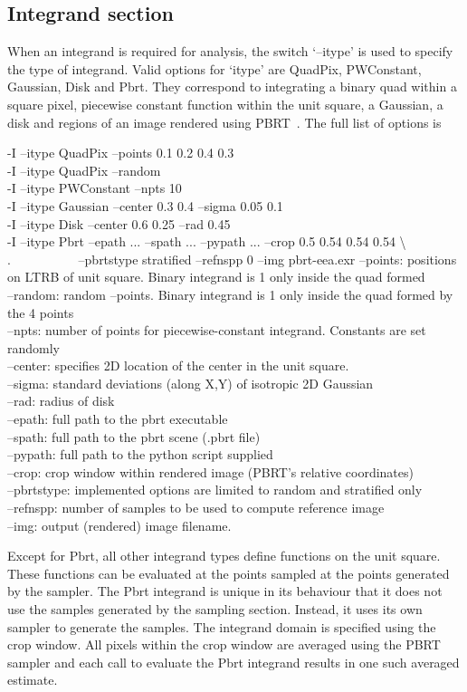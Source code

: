 \subsection{Integrand section}
When an integrand is required for analysis, the switch `--itype' is used to specify the type of integrand. Valid options for `itype' are QuadPix, PWConstant, Gaussian, Disk and Pbrt. They correspond to integrating a binary quad within a square pixel, piecewise constant function within the unit square, a Gaussian, a disk and regions of an image rendered using PBRT~\cite{Pharr:2010:PBR:1854996}. The full list of options is
\begin{tcolorbox}
  -I --itype QuadPix --points 0.1 0.2 0.4 0.3 \\
  -I --itype QuadPix --random \\
  -I --itype PWConstant --npts 10 \\
  -I --itype Gaussian --center 0.3 0.4 --sigma 0.05 0.1 \\
  -I --itype Disk --center 0.6 0.25 --rad 0.45 \\
  -I --itype Pbrt --epath ... --spath ... --pypath ... --crop 0.5 0.54 0.54 0.54 \textbackslash \\
  $.\quad\quad\quad\quad \quad$ --pbrtstype stratified --refnspp 0 --img pbrt-eea.exr 
 \tcblower
 --points: positions on LTRB of unit square. Binary integrand is 1 only inside the quad formed\\
 --random: random --points. Binary integrand is 1 only inside the quad formed by the 4 points\\
 --npts: number of points for piecewise-constant integrand. Constants are set randomly\\
 --center: specifies 2D location of the center in the unit square.\\
 --sigma: standard deviations (along X,Y) of isotropic 2D Gaussian\\
 --rad: radius of disk \\
 --epath: full path to the pbrt executable \\
 --spath: full path to the pbrt scene (.pbrt file)\\
 --pypath: full path to the python script supplied\\
 --crop: crop window within rendered image (PBRT's relative coordinates) \\
 --pbrtstype: implemented options are limited to random and stratified only\\
 --refnspp: number of samples to be used to compute reference image \\
 --img: output (rendered) image filename.
\end{tcolorbox}
Except for Pbrt, all other integrand types define functions on the unit square. These functions can be evaluated at the points sampled at the points generated by the sampler. The Pbrt integrand is unique in its behaviour that it does not use the samples generated by the sampling section. Instead, it uses its own sampler to generate the samples. The integrand domain is specified using the crop window. All pixels within the crop window are averaged using the PBRT sampler and each call to evaluate the Pbrt integrand results in one such averaged estimate.


